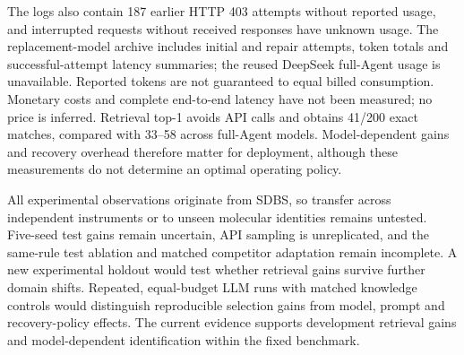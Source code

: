 The logs also contain 187 earlier HTTP 403 attempts without reported usage, and interrupted requests without received responses have unknown usage. The replacement-model archive includes initial and repair attempts, token totals and successful-attempt latency summaries; the reused DeepSeek full-Agent usage is unavailable. Reported tokens are not guaranteed to equal billed consumption. Monetary costs and complete end-to-end latency have not been measured; no price is inferred. Retrieval top-1 avoids API calls and obtains 41/200 exact matches, compared with 33--58 across full-Agent models. Model-dependent gains and recovery overhead therefore matter for deployment, although these measurements do not determine an optimal operating policy.

All experimental observations originate from SDBS, so transfer across independent instruments or to unseen molecular identities remains untested. Five-seed test gains remain uncertain, API sampling is unreplicated, and the same-rule test ablation and matched competitor adaptation remain incomplete. A new experimental holdout would test whether retrieval gains survive further domain shifts. Repeated, equal-budget LLM runs with matched knowledge controls would distinguish reproducible selection gains from model, prompt and recovery-policy effects. The current evidence supports development retrieval gains and model-dependent identification within the fixed benchmark.
